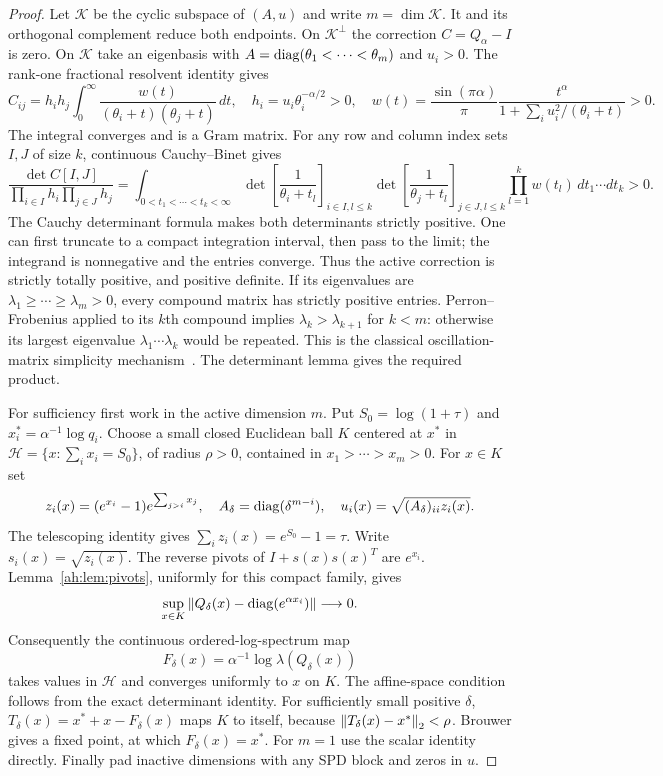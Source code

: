 \begin{proof}
Let $\mathcal K$ be the cyclic subspace of $(A,u)$ and write
$m=\dim\mathcal K$. It and its orthogonal complement reduce both
endpoints. On $\mathcal K^\perp$ the correction $C=Q_\alpha-I$ is zero.
On $\mathcal K$ take an eigenbasis with
$A=\operatorname{diag}(\theta_1<\cdots<\theta_m)$ and $u_i>0$.
The rank-one fractional resolvent identity gives
\[
 C_{ij}=h_i h_j\int_0^\infty
 \frac{w(t)}{(\theta_i+t)(\theta_j+t)}\,dt,
 \quad h_i=u_i\theta_i^{-\alpha/2}>0,
 \quad
 w(t)=\frac{\sin(\pi\alpha)}\pi
 \frac{t^\alpha}{1+\sum_i u_i^2/(\theta_i+t)}>0.
\]
The integral converges and is a Gram matrix. For any row and column
index sets $I,J$ of size $k$, continuous Cauchy--Binet gives
\[
 \frac{\det C[I,J]}{\prod_{i\in I}h_i\prod_{j\in J}h_j}
 =\int_{0<t_1<\cdots<t_k<\infty}
 \det\left[\frac1{\theta_i+t_l}\right]_{i\in I,l\le k}
 \det\left[\frac1{\theta_j+t_l}\right]_{j\in J,l\le k}
 \prod_{l=1}^k w(t_l)\,dt_1\cdots dt_k>0.
\]
The Cauchy determinant formula makes both determinants strictly positive.
One can first truncate to a compact integration interval, then pass
to the limit; the integrand is nonnegative and the entries converge.
Thus the active correction is strictly totally positive, and positive
definite. If its eigenvalues are
$\lambda_1\ge\cdots\ge\lambda_m>0$, every compound matrix has
strictly positive entries. Perron--Frobenius applied to its $k$th
compound implies $\lambda_k>\lambda_{k+1}$ for $k<m$:
otherwise its largest eigenvalue $\lambda_1\cdots\lambda_k$ would be
repeated. This is the classical oscillation-matrix simplicity mechanism~\cite{Pinkus}.
The determinant lemma gives the required product.

For sufficiency first work in the active dimension $m$.
Put $S_0=\log(1+\tau)$ and $x_i^*=\alpha^{-1}\log q_i$.
Choose a small closed Euclidean ball $K$ centered at $x^*$ in
$\mathcal H=\{x:\sum_i x_i=S_0\}$, of radius $\rho>0$,
contained in $x_1>\cdots>x_m>0$. For $x\in K$ set
\[
 z_i(x)=(e^{x_i}-1)e^{\sum_{j>i}x_j},\quad
 A_\delta=\operatorname{diag}(\delta^{m-i}),\quad
 u_i(x)=\sqrt{(A_\delta)_{ii}z_i(x)}.
\]
The telescoping identity gives $\sum_i z_i(x)=e^{S_0}-1=\tau$.
Write $s_i(x)=\sqrt{z_i(x)}$. The reverse pivots of
$I+s(x)s(x)^T$ are $e^{x_i}$.
Lemma~\ref{ah:lem:pivots}, uniformly for this compact family, gives
\[
 \sup_{x\in K}\left\lVert Q_\delta(x)-\operatorname{diag}(e^{\alpha x_i})\right\rVert
 \longrightarrow0.
\]
Consequently the continuous ordered-log-spectrum map
\[
 F_\delta(x)=\alpha^{-1}\log\lambda(Q_\delta(x))
\]
takes values in $\mathcal H$ and converges uniformly to $x$ on $K$.
The affine-space condition follows from the exact determinant identity.
For sufficiently small positive $\delta$,
$T_\delta(x)=x^*+x-F_\delta(x)$ maps $K$ to itself, because
$\left\lVert T_\delta(x)-x^*\right\rVert_2<\rho$.
Brouwer gives a fixed point, at which $F_\delta(x)=x^*$.
For $m=1$ use the scalar identity directly. Finally pad inactive
dimensions with any SPD block and zeros in $u$.
\end{proof}

